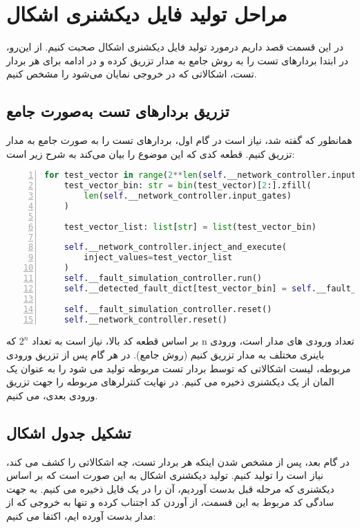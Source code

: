 \section{مراحل تولید فایل دیکشنری اشکال}
در این قسمت قصد داریم در‌مورد تولید فایل دیکشنری اشکال صحبت کنیم.
از این‌رو، در ابتدا بردار‌های تست را به روش جامع به مدار تزریق کرده و در ادامه برای هر بردار تست، اشکالاتی که در خروجی نمایان می‌شود را مشخص کنیم.

\subsection{تزریق بردارهای تست به‌صورت جامع}
همانطور که گفته شد، نیاز است در گام اول، بردارهای تست را به صورت جامع به مدار تزریق کنیم. قطعه کدی که این موضوع را بیان می‌کند به شرح زیر است:

\small{
\begin{latin}
\begin{lstlisting}[numbers=left, breaklines=true,language=Python]
for test_vector in range(2**len(self.__network_controller.input_gates)):
	test_vector_bin: str = bin(test_vector)[2:].zfill(
		len(self.__network_controller.input_gates)
	)
	
	test_vector_list: list[str] = list(test_vector_bin)
	
	self.__network_controller.inject_and_execute(
		inject_values=test_vector_list
	)
	self.__fault_simulation_controller.run()
	self.__detected_fault_dict[test_vector_bin] = self.__fault_simulation_controller.detectable_faults
	
	self.__fault_simulation_controller.reset()
	self.__network_controller.reset()
\end{lstlisting}
\end{latin}
}

بر اساس قطعه کد بالا، نیاز است به تعداد 
$2^n$
که n تعداد ورودی های مدار است، ورودی باینری مختلف به مدار تزریق کنیم (روش جامع). در هر گام پس از تزریق ورودی مربوطه، لیست اشکالاتی که توسط بردار تست مربوطه تولید می شود را به عنوان یک المان از یک دیکشنری ذخیره می کنیم. در نهایت کنترلر‌های مربوطه را جهت تزریق ورودی بعدی، 
می کنیم.

\subsection{تشکیل جدول اشکال}
در گام بعد، پس از مشخص شدن اینکه هر بردار تست، چه اشکالاتی را کشف می کند، نیاز است را تولید کنیم. 
تولید دیکشنری اشکال به این صورت است که بر اساس دیکشنری که مرحله قبل بدست آوردیم، آن را در یک فایل 
ذخیره می کنیم. به جهت سادگی کد مربوط به این قسمت، از آوردن کد اجتناب کرده و تنها به خروجی که از مدار 
بدست آورده ایم، اکتفا می کنیم: 

